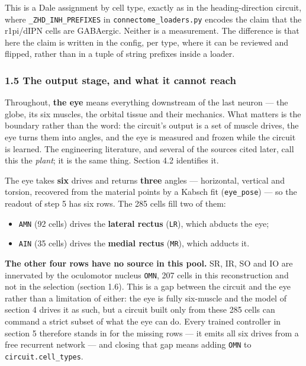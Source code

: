 \documentclass[10pt]{article}
\begin{document}
This is a Dale assignment by cell type, exactly as in the heading-direction circuit, where
\texttt{\_ZHD\_INH\_PREFIXES} in \texttt{connectome\_loaders.py} encodes the claim that the
r1pi/dIPN cells are GABAergic. Neither is a measurement. The difference is that here the
claim is written in the config, per type, where it can be reviewed and flipped, rather than
in a tuple of string prefixes inside a loader.

\subsubsection*{1.5 The output stage, and what it cannot reach}

Throughout, \textbf{the eye} means everything downstream of the last neuron --- the globe,
its six muscles, the orbital tissue and their mechanics. What matters is the boundary rather
than the word: the circuit's output is a set of muscle drives, the eye turns them into
angles, and the eye is measured and frozen while the circuit is learned. The engineering
literature, and several of the sources cited later, call this the \emph{plant}; it is the
same thing. Section 4.2 identifies it.

The eye takes \textbf{six} drives and returns \textbf{three} angles --- horizontal, vertical
and torsion, recovered from the material points by a Kabsch fit (\texttt{eye\_pose}) --- so
the readout of step 5 has six rows. The 285 cells fill two of them:

\begin{itemize}\setlength{\itemsep}{1pt}
\item \texttt{AMN} (92 cells) drives the \textbf{lateral rectus} (\texttt{LR}), which
abducts the eye;
\item \texttt{AIN} (35 cells) drives the \textbf{medial rectus} (\texttt{MR}), which adducts
it.
\end{itemize}

\textbf{The other four rows have no source in this pool.} SR, IR, SO and IO are innervated
by the oculomotor nucleus \texttt{OMN}, 207 cells in this reconstruction and not in the
selection (section 1.6). This is a gap between the circuit and the eye rather than a
limitation of either: the eye is fully six-muscle and the model of section 4 drives it as
such, but a circuit built only from these 285 cells can command a strict subset of what the
eye can do. Every trained controller in section 5 therefore stands in for the missing rows
--- it emits all six drives from a free recurrent network --- and closing that gap means
adding \texttt{OMN} to \texttt{circuit.cell\_types}.
\end{document}

